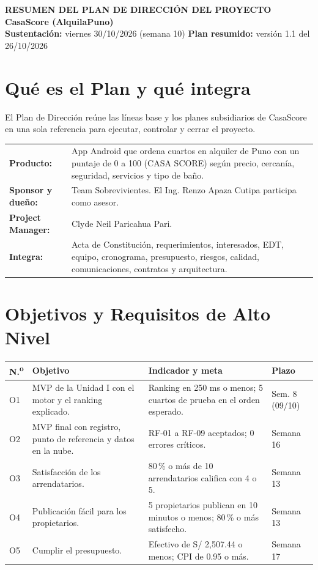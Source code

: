\documentclass[11pt,a4paper]{article}
\begin{document}
\begin{center}
    {\Large \textbf{\textcolor{AzulUNA}{RESUMEN DEL PLAN DE DIRECCIÓN DEL PROYECTO}}}\\[3pt]
    {\normalsize \textbf{CasaScore (AlquilaPuno)}}\\[4pt]
    \footnotesize \textbf{Sustentación:} viernes 30/10/2026 (semana 10) \quad \textbar\quad \textbf{Plan resumido:} versión 1.1 del 26/10/2026
\end{center}

\section{Qué es el Plan y qué integra}
{\small
\noindent El Plan de Dirección reúne las líneas base y los planes subsidiarios de CasaScore en una sola referencia para ejecutar, controlar y cerrar el proyecto.

\vspace{0.1cm}
\noindent\begin{tabularx}{\textwidth}{@{}P{3.6cm} L@{}}
\toprule
\textbf{Producto:} & App Android que ordena cuartos en alquiler de Puno con un puntaje de 0 a 100 (CASA SCORE) según precio, cercanía, seguridad, servicios y tipo de baño. \\
\textbf{Sponsor y dueño:} & Team Sobrevivientes. El Ing. Renzo Apaza Cutipa participa como asesor. \\
\textbf{Project Manager:} & Clyde Neil Paricahua Pari. \\
\textbf{Integra:} & Acta de Constitución, requerimientos, interesados, EDT, equipo, cronograma, presupuesto, riesgos, calidad, comunicaciones, contratos y arquitectura. \\
\bottomrule
\end{tabularx}
}

\section{Objetivos y Requisitos de Alto Nivel}
{\small
{}
\noindent\begin{tabularx}{\textwidth}{@{}C{0.7cm} L L P{2.2cm}@{}}
\toprule
{}
\textbf{N.\textsuperscript{o}} & \textbf{Objetivo} & \textbf{Indicador y meta} & \textbf{Plazo} \\
\midrule
O1 & MVP de la Unidad I con el motor y el ranking explicado. & Ranking en 250 ms o menos; 5 cuartos de prueba en el orden esperado. & Sem. 8 (09/10) \\
O2 & MVP final con registro, punto de referencia y datos en la nube. & RF-01 a RF-09 aceptados; 0 errores críticos. & Semana 16 \\
O3 & Satisfacción de los arrendatarios. & 80\,\% o más de 10 arrendatarios califica con 4 o 5. & Semana 13 \\
O4 & Publicación fácil para los propietarios. & 5 propietarios publican en 10 minutos o menos; 80\,\% o más satisfecho. & Semana 13 \\
O5 & Cumplir el presupuesto. & Efectivo de S/ 2,507.44 o menos; CPI de 0.95 o más. & Semana 17 \\
\bottomrule
\end{tabularx}
}
\end{document}
